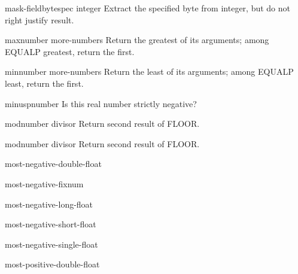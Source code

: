 \begin{accessor}{mask-field}{bytespec integer}{}
  Extract the specified byte from integer,  but do not right justify result.
\end{accessor}

\begin{function}{max}{number \rest more-numbers}{}
  Return the greatest of its arguments; among EQUALP greatest, return
the first.
\end{function}

\begin{function}{min}{number \rest more-numbers}{}
  Return the least of its arguments; among EQUALP least, return
the first.
\end{function}

\begin{function}{minusp}{number}{}
  Is this real number strictly negative?
\end{function}

\begin{function}{mod}{number divisor}{}
  Return second result of FLOOR.
\end{function}

\begin{type-specifier}{mod}{number divisor}{}
  Return second result of FLOOR.
\end{type-specifier}

\begin{constant}{most-negative-double-float}{}{}
  
\end{constant}

\begin{constant}{most-negative-fixnum}{}{}
  
\end{constant}

\begin{constant}{most-negative-long-float}{}{}
  
\end{constant}

\begin{constant}{most-negative-short-float}{}{}
  
\end{constant}

\begin{constant}{most-negative-single-float}{}{}
  
\end{constant}

\begin{constant}{most-positive-double-float}{}{}
  
\end{constant}

